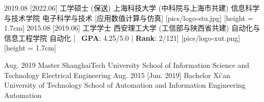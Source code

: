 \ifzh
    \begin{educations}[logo]
        \education
        {2019.08}
        [2022.06]
        {工学硕士 (保送)}
        {上海科技大学 (中科院与上海市共建)}
        {信息科学与技术学院}
        {电子科学与技术}
        [\textbullet 应用数值计算与仿真] %
        [pics/logo-stu.jpg]
        [height = 1.7cm]
        \separator{0.5ex}
        \education
        {2015.08}
        [2019.06]
        {工学学士}
        {西安理工大学 (工信部与陕西省共建)}
        {自动化与信息工程学院}
        {自动化}
        [\textbullet ~ \textbf{GPA}: 4.25/5.0 | \textbf{Rank}: 2/121]
        [pics/logo-xut.png]
        [height = 1.7cm]
    \end{educations}
\else
    \begin{educations}
        \education
        {Aug. 2019}
        {Master}
        {ShanghaiTech University}
        {School of Information Science and Technology}
        {Electrical Engineering}
        \separator{0.5ex}
        \education
        {Aug. 2015}
        [Jun. 2019]
        {Bachelor}
        {Xi'an University of Technology}
        {School of Automation and Information Engineering}
        {Automation}
    \end{educations}
\fi